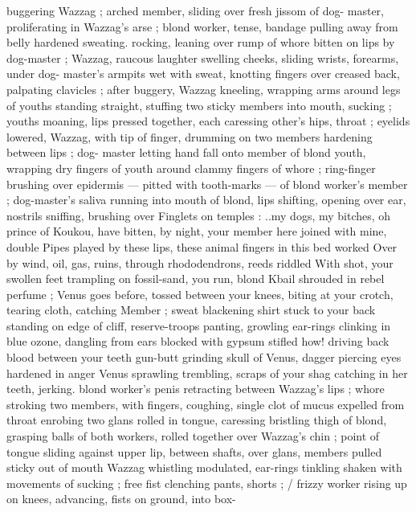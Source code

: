 buggering Wazzag ; arched member, sliding over fresh jissom of dog- 
master, proliferating in Wazzag's arse ; blond worker, tense, bandage 
pulling away from belly hardened sweating. rocking, leaning over 
rump of whore bitten on lips by dog-master ; Wazzag, raucous 
laughter swelling cheeks, sliding wrists, forearms, under dog- 
master's armpits wet with sweat, knotting fingers over creased back, 
palpating clavicles ; after buggery, Wazzag kneeling, wrapping arms 
around legs of youths standing straight, stuffing two sticky members 
into mouth, sucking ; youths moaning, lips pressed together, each 
caressing other's hips, throat ; eyelids lowered, Wazzag, with tip of 
finger, drumming on two members hardening between lips ; dog- 
master letting hand fall onto member of blond youth, wrapping dry 
fingers of youth around clammy fingers of whore ; ring-finger 
brushing over epidermis --- pitted with tooth-marks --- of blond 
worker's member ; dog-master's saliva running into mouth of blond, 
lips shifting, opening over ear, nostrils sniffing, brushing over 
Finglets on temples : {\gl}{\thd}..my dogs, my bitches, oh prince of Koukou, 
have bitten, by night, your member here joined with mine, double 
Pipes played by these lips, these animal fingers{\thd} in this bed worked 
Over by wind, oil, gas, ruins, through rhododendrons, reeds riddled 
With shot, your swollen feet trampling on fossil-sand, you run, blond 
Kbail{\thd} shrouded in rebel perfume ; Venus goes before, tossed 
between your knees, biting at your crotch, tearing cloth, catching 
Member ; sweat blackening shirt stuck to your back{\thd} standing on 
edge of cliff, reserve-troops panting, growling{\thd} ear-rings clinking in 
blue ozone, dangling from ears blocked with gypsum{\thd} stifled how! 
driving back blood between your teeth{\thd} gun-butt grinding skull of 
Venus, dagger piercing eyes hardened in anger{\thd} Venus sprawling 
trembling, scraps of your shag catching in her teeth, jerking.{\gr} 
blond worker's penis retracting between Wazzag's lips ; whore 
stroking two members, with fingers, coughing, single clot of mucus 
expelled from throat enrobing two glans rolled in tongue, caressing 
bristling thigh of blond, grasping balls of both workers, rolled 
together over Wazzag's chin ; point of tongue sliding against upper 
lip, between shafts, over glans, members pulled sticky out of mouth 
Wazzag whistling modulated, ear-rings tinkling shaken with 
movements of sucking ; free fist clenching pants, shorts ; {\slash} frizzy 
worker rising up on knees, advancing, fists on ground, into box- 
